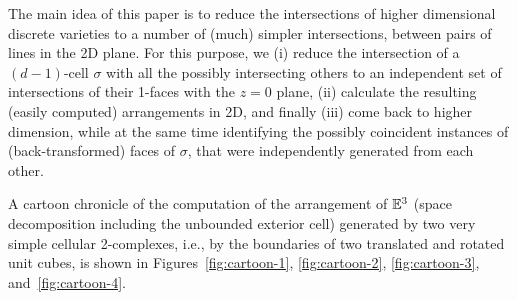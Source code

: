 The main idea of this paper is to reduce the intersections of higher dimensional discrete varieties to a number of (much) simpler intersections, between pairs of lines in the 2D plane. For this purpose, we (i) reduce the intersection of a $(d-1)$-cell $\sigma$ with all the possibly intersecting others to an independent set of intersections of their 1-faces with the $z=0$ plane, (ii) calculate the resulting (easily computed) arrangements in 2D, and finally (iii) come back to higher dimension, while at the same time identifying the possibly coincident instances of (back-transformed) faces of $\sigma$, that were independently generated from each other.

A cartoon chronicle of the computation of the {arrangement of $\mathbb{E}^3$} {(space decomposition including the unbounded exterior cell)} generated by two very simple cellular 2-complexes, i.e., by the boundaries of two translated and rotated unit cubes, is shown in Figures~\ref{fig:cartoon-1}, \ref{fig:cartoon-2}, \ref{fig:cartoon-3}, and~\ref{fig:cartoon-4}. 


